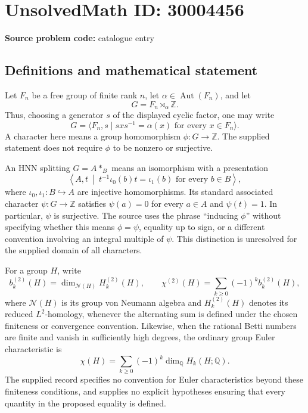 \documentclass[11pt]{article}
\newcommand{\Z}{\mathbb{Z}}
\newcommand{\Q}{\mathbb{Q}}
\begin{document}
\section*{UnsolvedMath ID: 30004456}
\textbf{Source problem code:} catalogue entry
\subsection{Definitions and mathematical statement}
Let \(F_n\) be a free group of finite rank \(n\), let \(\alpha\in\operatorname{Aut}(F_n)\), and let
\[
G=F_n\rtimes_\alpha\Z.
\]
Thus, choosing a generator \(s\) of the displayed cyclic factor, one may write
\[
G=\langle F_n,s\mid sxs^{-1}=\alpha(x)\text{ for every }x\in F_n\rangle.
\]
A character here means a group homomorphism \(\phi:G\to\Z\). The supplied statement does not require \(\phi\) to be nonzero or surjective.

An HNN splitting \(G=A*_B\) means an isomorphism with a presentation
\[
\left\langle A,t\ \middle|\ t^{-1}\iota_0(b)t=\iota_1(b)\text{ for every }b\in B\right\rangle,
\]
where \(\iota_0,\iota_1:B\hookrightarrow A\) are injective homomorphisms. Its standard associated character \(\psi:G\to\Z\) satisfies \(\psi(a)=0\) for every \(a\in A\) and \(\psi(t)=1\). In particular, \(\psi\) is surjective. The source uses the phrase ``inducing \(\phi\)'' without specifying whether this means \(\phi=\psi\), equality up to sign, or a different convention involving an integral multiple of \(\psi\). This distinction is unresolved for the supplied domain of all characters.

For a group \(H\), write
\[
b_k^{(2)}(H)=\dim_{\mathcal N(H)}H_k^{(2)}(H),
\qquad
\chi^{(2)}(H)=\sum_{k\geq 0}(-1)^k b_k^{(2)}(H),
\]
where \(\mathcal N(H)\) is its group von Neumann algebra and \(H_k^{(2)}(H)\) denotes its reduced \(L^2\)-homology, whenever the alternating sum is defined under the chosen finiteness or convergence convention. Likewise, when the rational Betti numbers are finite and vanish in sufficiently high degrees, the ordinary group Euler characteristic is
\[
\chi(H)=\sum_{k\geq 0}(-1)^k\dim_{\Q}H_k(H;\Q).
\]
The supplied record specifies no convention for Euler characteristics beyond these finiteness conditions, and supplies no explicit hypotheses ensuring that every quantity in the proposed equality is defined.
\end{document}
